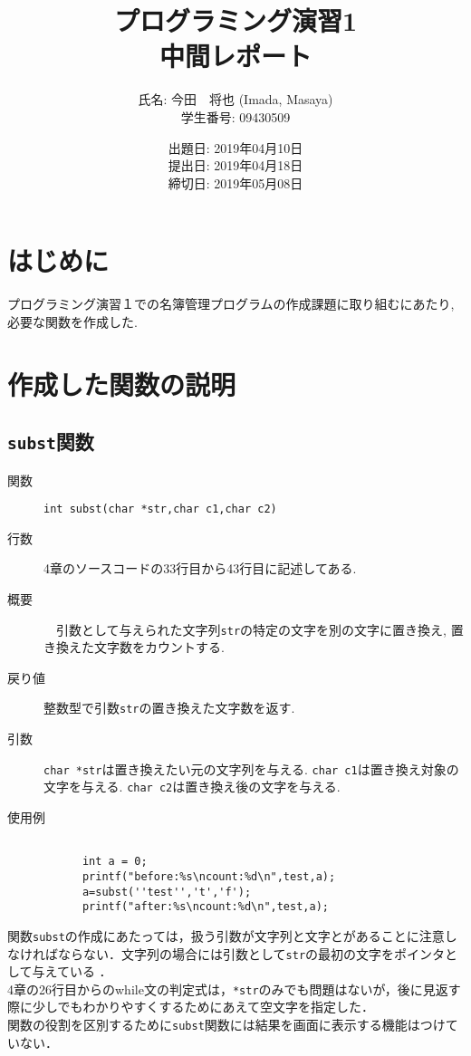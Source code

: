 \documentclass[a4j,11pt]{jarticle}
\title{プログラミング演習1 \\
       中間レポート}
\author{氏名: 今田　将也 (Imada, Masaya) \\
        学生番号: 09430509}
\date{出題日: 2019年04月10日 \\
      提出日: 2019年04月18日 \\
      締切日: 2019年05月08日 \\}  %
\begin{document}
\maketitle

\section{はじめに}
プログラミング演習１での名簿管理プログラムの作成課題に取り組むにあたり, 必要な関数を作成した. 

\section{作成した関数の説明}

\subsection{\texttt{subst}関数}
 \begin{description}
    \item[関数] \verb|int subst(char *str,char c1,char c2)|
    \item[行数]  4章のソースコードの33行目から43行目に記述してある.
    \item[概要]　引数として与えられた文字列\verb|str|の特定の文字を別の文字に置き換え, 置き換えた文字数をカウントする.
    \item[戻り値]整数型で引数\verb|str|の置き換えた文字数を返す.
    \item[引数]  \verb|char *str|は置き換えたい元の文字列を与える. \verb|char c1|は置き換え対象の文字を与える. \verb|char c2|は置き換え後の文字を与える.
    \item[使用例]
      \begin{verbatim}

      int a = 0;
      printf("before:%s\ncount:%d\n",test,a);
      a=subst(''test'','t','f');
      printf("after:%s\ncount:%d\n",test,a);
      \end{verbatim}
	
  \end{description}
関数\verb|subst|の作成にあたっては，扱う引数が文字列と文字とがあることに注意しなければならない．文字列の場合には引数として\verb|str|の最初の文字をポインタとして与えている
．\\4章の26行目からのwhile文の判定式は，\verb|*str|のみでも問題はないが，後に見返す際に少しでもわかりやすくするためにあえて空文字を指定した．\\関数の役割を区別するために\verb|subst|関数には結果を画面に表示する機能はつけていない．
\end{document}
